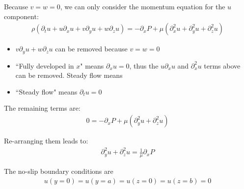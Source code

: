 \begin{solution} 

Because $v = w = 0$, we can only consider the momentum equation for the $u$ component:
    \begin{align*}
      \rho(\partial_{t}u + u\partial_{x}u + v\partial_{y}u + w\partial_{z}u) = - \partial_{x}P + {\mu}(\partial_{x}^{2}u + \partial_{y}^{2}u + \partial_{z}^{2}u)
    \end{align*}

    \begin{itemize}
    	\item $v\partial_{y}u + w\partial_{z}u$ can be removed because $v = w = 0$
	\item ``Fully developed in $x$" means $\partial_{x}u=0$, thus the $u\partial_{x}u$ and $\partial_{x}^{2}u$ terms above can be removed. Steady flow means 
   	\item ``Steady flow" means  $\partial_{t}u=0$
    \end{itemize}
   
The remaining terms are:
       \begin{align*}
      0 = - \partial_{x}P + {\mu}(\partial_{y}^{2}u + \partial_{z}^{2}u)
    \end{align*}

Re-arranging them leads to:
    \begin{align*}
      \partial_{y}^{2}u + \partial_{z}^{2}u = \frac{1}{\mu}\partial_{x}P
    \end{align*}
    
The no-slip boundary conditions are 
    \begin{align*}
      u(y=0) = u(y=a) = u(z=0) = u(z=b) = 0
    \end{align*}

\end{solution} 